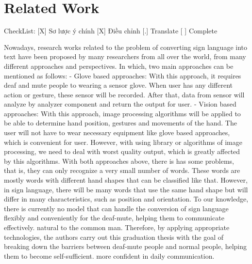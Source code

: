 \chapter{Related Work}
  CheckList: 
    [X] Sơ lược ý chính
    [X] Điều chỉnh
    [.] Translate
    [ ] Complete

    Nowadays, research works related to the problem of converting sign language into text 
    have been proposed by many researchers from all over the world, from many different 
    approaches and perspectives. In which, two main approaches can be mentioned as follows:
      - Glove based approaches:
        With this approach, it requires deaf and mute people to wearing a sensor glove. When user
        has any different action or gesture, these sensor will be recorded. After that, data from
        sensor will analyze by analyzer component and return the output for user.
      - Vision based approaches:
        With this approach, image processing algorithms will be applied to be able to determine
        hand position, gestures and movements of the hand. The user will not have to wear necessary
        equipment like glove based approaches, which is convenient for user. However, with using
        library or algorithms of image processing, we need to deal with worst quality output, which is
        greatly affected by this algorithms.
    With both approaches above, there is has some problems, that is, they can only recognize 
    a very small number of words. These words are mostly words with different hand shapes 
    that can be classified like that. However, in sign language, there will be many words 
    that use the same hand shape but will differ in many characteristics, such as position 
    and orientation. To our knowledge, there is currently no model that can handle the 
    conversion of sign language flexibly and conveniently for the deaf-mute, helping them 
    to communicate effectively. natural to the common man. Therefore, by applying appropriate 
    technologies, the authors carry out this graduation thesis with the goal of breaking down 
    the barriers between deaf-mute people and normal people, helping them to become self-sufficient. 
    more confident in daily communication.



